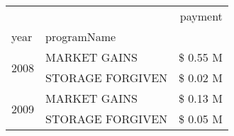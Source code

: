 \begin{tabular}{llr}
\toprule
 &  & payment \\
year & programName &  \\
\midrule
\multirow[t]{2}{*}{2008} & MARKET GAINS & \$ 0.55 M \\
 & STORAGE FORGIVEN & \$ 0.02 M \\
\cline{1-3}
\multirow[t]{2}{*}{2009} & MARKET GAINS & \$ 0.13 M \\
 & STORAGE FORGIVEN & \$ 0.05 M \\
\cline{1-3}
\bottomrule
\end{tabular}
